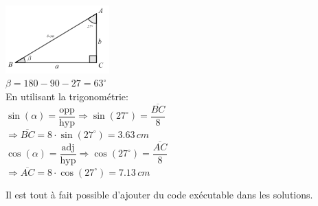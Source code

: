 \documentclass[a4paper,11pt]{article}
\begin{document}
\begin{solution}
\includegraphics[width=0.3\textwidth]{images/trianglerectexemple.png}\\
$\beta=180-90-27=63^{\circ}$\\
En utilisant la trigonométrie:\\
$\sin(\alpha)=\dfrac{\text{opp}}{\text{hyp}} \Rightarrow \sin(27^{\circ})=\dfrac{\overline{BC}}{8}$\\
$\Rightarrow \overline{BC}=8 \cdot \sin(27^{\circ})=3.63\,cm$\\
$\cos(\alpha)=\dfrac{\text{adj}}{\text{hyp}} \Rightarrow \cos(27^{\circ})=\dfrac{\overline{AC}}{8}$\\
$\Rightarrow \overline{AC}=8 \cdot \cos(27^{\circ})=7.13\,cm$\\
\end{solution}

Il est tout à fait possible d’ajouter du code exécutable dans les solutions.
\end{document}
